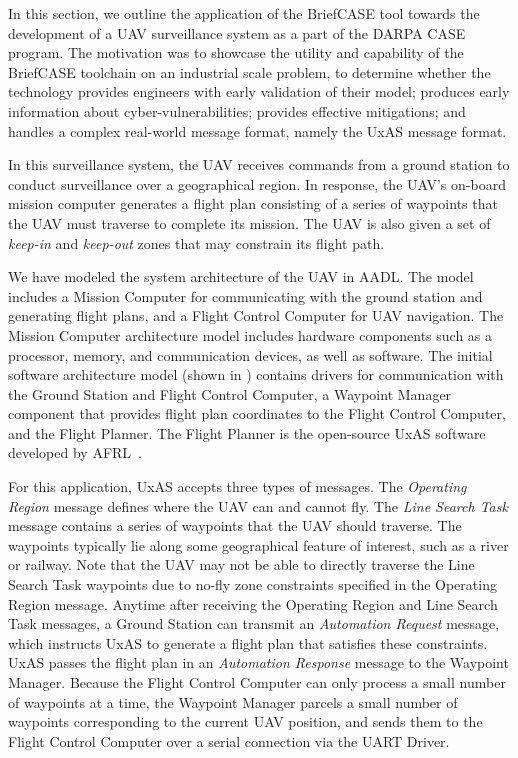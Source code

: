 In this section, we outline the application of the BriefCASE tool towards the development of a UAV surveillance system as a part of the DARPA CASE program.
The motivation was to showcase the utility and capability of the BriefCASE toolchain on an industrial scale problem, to determine whether the technology provides engineers with early validation of their model; produces early information about cyber-vulnerabilities; provides effective mitigations; and handles a complex real-world message format, namely  the UxAS message format.

In this surveillance system, the UAV receives commands from a ground station to conduct surveillance over a geographical region. In response, the UAV's on-board mission computer generates a flight plan consisting of a series of waypoints that the UAV must traverse to complete its mission. The UAV is also given a set of \textit{keep-in} and \textit{keep-out} zones that may constrain its flight path.

We have modeled the system architecture of the UAV in AADL.  The model includes a Mission Computer for communicating with the ground station and generating flight plans, and a Flight Control Computer for UAV navigation.  The Mission Computer architecture model includes hardware components such as a processor, memory, and communication devices, as well as software.
%
The initial software architecture model (shown in ) contains drivers for communication with the Ground Station and Flight Control Computer, a Waypoint Manager component that provides flight plan coordinates to the Flight Control Computer, and the Flight Planner.  The Flight Planner is the open-source UxAS software developed by AFRL~\cite{uxas}. 

For this application, UxAS accepts three types of messages.  The \textit{Operating Region} message defines where the UAV can and cannot fly.  The \textit{Line Search Task} message contains a series of waypoints that the UAV should traverse.  The waypoints typically lie along some geographical feature of interest, such as a river or railway.  Note that the UAV may not be able to directly traverse the Line Search Task waypoints due to no-fly zone constraints specified in the Operating Region message.  Anytime after receiving the Operating Region and Line Search Task messages, a Ground Station can transmit an \textit{Automation Request} message, which instructs UxAS to generate a flight plan that satisfies these constraints.  UxAS passes the flight plan in an \textit{Automation Response} message to the Waypoint Manager.  Because the Flight Control Computer can only process a small number of waypoints at a time, the Waypoint Manager parcels a small number of waypoints corresponding to the current UAV position, and sends them to the Flight Control Computer over a serial connection via the UART Driver.

